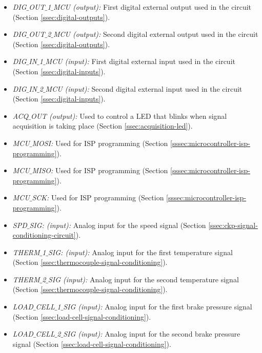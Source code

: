 \begin{itemize}
					\item \textit{DIG$\_$OUT$\_$1$\_$MCU (output):} First digital external output used in the circuit (Section \ref{ssec:digital-outputs}).\label{itm:mcu-port-dig-out-1-mcu}
					\item \textit{DIG$\_$OUT$\_$2$\_$MCU (output):} Second digital external output used in the circuit (Section \ref{ssec:digital-outputs}).\label{itm:mcu-port-dig-out-2-mcu}
					\item \textit{DIG$\_$IN$\_$1$\_$MCU (input):} First digital external input used in the circuit (Section \ref{ssec:digital-inputs}).\label{itm:mcu-port-dig-in-1-mcu}
					\item \textit{DIG$\_$IN$\_$2$\_$MCU (input):} Second digital external input used in the circuit (Section \ref{ssec:digital-inputs}).\label{itm:mcu-port-dig-in-2-mcu} 
					\item \textit{ACQ$\_$OUT (output):} Used to control a LED that blinks when signal acquisition is taking place (Section \ref{ssec:acquisition-led}).\label{itm:mcu-port-acq-out}   
					\item \textit{MCU$\_$MOSI:} Used for ISP programming (Section \ref{sssec:microcontroller-isp-programming}).\label{itm:mcu-port-mcu-mosi}
					\item \textit{MCU$\_$MISO:} Used for ISP programming (Section \ref{sssec:microcontroller-isp-programming}).\label{itm:mcu-port-mcu-miso}
					\item \textit{MCU$\_$SCK:} Used for ISP programming (Section \ref{sssec:microcontroller-isp-programming}).\label{itm:mcu-port-mcu-sck}
					\item \textit{SPD$\_$SIG: (input):} Analog input for the speed signal (Section \ref{ssec:ckp-signal-conditioning-circuit}).\label{itm:mcu-port-spd-sig}
					\item \textit{THERM$\_$1$\_$SIG: (input):} Analog input for the first temperature signal (Section \ref{ssec:thermocouple-signal-conditioning}).\label{itm:mcu-port-therm-1-sig}
					\item \textit{THERM$\_$2$\_$SIG (input):} Analog input for the second temperature signal (Section \ref{ssec:thermocouple-signal-conditioning}).\label{itm:mcu-port-therm-2-sig}
					\item \textit{LOAD$\_$CELL$\_$1$\_$SIG (input):} Analog input for the first brake pressure signal (Section \ref{ssec:load-cell-signal-conditioning}).\label{itm:mcu-port-load-cell-1-sig}  
					\item \textit{LOAD$\_$CELL$\_$2$\_$SIG (input):} Analog input for the second brake pressure signal (Section \ref{ssec:load-cell-signal-conditioning}).\label{itm:mcu-port-load-cell-2-sig} 

\end{itemize}

